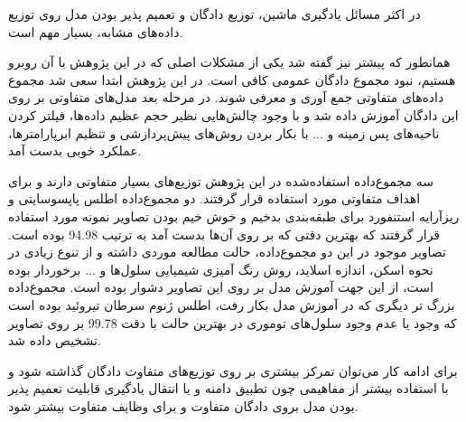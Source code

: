 در اکثر مسائل یادگیری ماشین، توزیع دادگان و تعمیم پذیر بودن مدل روی توزیع داده‌های مشابه، بسیار مهم است. 

همانطور که پیشتر نیز گفته شد یکی از مشکلات اصلی که در این پژوهش با آن روبرو هستیم، نبود مجموع دادگان عمومی کافی است.
در این پژوهش ابتدا سعی شد مجموع داده‌های متفاوتی جمع آوری و معرفی شوند.
در مرحله بعد مدل‌های متفاوتی بر روی این دادگان آموزش داده شد و با وجود چالش‌هایی نظیر حجم عظیم داده‌ها، فیلتر کردن ناحیه‌های پس زمینه و ... با بکار بردن روش‌های پیش‌پردازشی و تنظیم ابرپارامتر‌ها، عملکرد خوبی بدست آمد.

سه مجموع‌داده استفاده‌شده در این پژوهش توزیع‌های بسیار متفاوتی دارند و برای اهداف متفاوتی مورد استفاده قرار گرفتند.
دو مجموع‌داده اطلس پاپسوسایتی و ریزآرایه استنفورد برای طبقه‌بندی بدخیم و خوش خیم بودن تصاویر نمونه مورد استفاده قرار گرفتند که بهترین دقتی که بر روی آن‌ها بدست آمد به ترتیب 94.98 بوده است. تصاویر موجود در این دو مجموع‌داده، حالت مطالعه موردی داشته و از تنوع زیادی در نحوه اسکن، اندازه اسلاید، روش رنگ آمیزی شیمیایی سلول‌ها و ... برخوردار بوده است، از این جهت آموزش مدل بر روی این تصاویر دشوار بوده است.
مجموع‌داده بزرگ تر دیگری که در آموزش مدل بکار رفت، اطلس ژنوم سرطان تیروئید بوده است که وجود یا عدم وجود سلول‌های توموری در بهترین حالت با دقت  99.78 بر روی تصاویر تشخیص داده شد.

برای ادامه کار می‌توان تمرکز بیشتری بر روی توزیع‌های متفاوت دادگان گذاشته شود و با استفاده بیشتر از مفاهیمی چون تطبیق دامنه و یا انتقال یادگیری قابلیت تعمیم پذیر بودن مدل بروی دادگان متفاوت و برای وظایف متفاوت بیشتر شود.